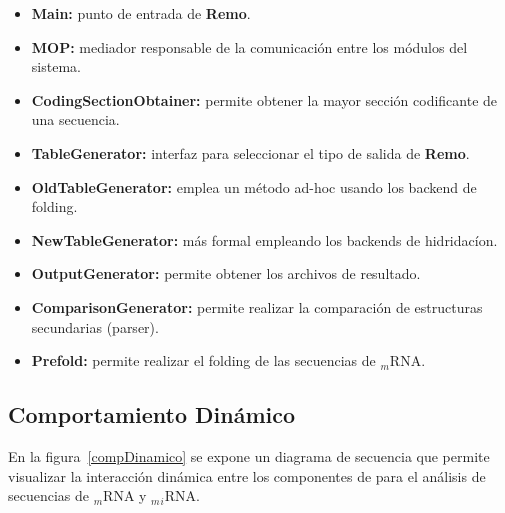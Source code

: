 \begin{itemize}
	\item \textbf{Main:} punto de entrada de \textbf{Remo}.
	\item \textbf{MOP:} mediador responsable de la comunicación entre los módulos del sistema.

	\item \textbf{CodingSectionObtainer:} permite obtener la mayor sección codificante de una secuencia.

	\item \textbf{TableGenerator:} interfaz para seleccionar el tipo de salida de \textbf{Remo}.

	\item \textbf{OldTableGenerator:} emplea un método ad-hoc usando los backend de folding.

	\item \textbf{NewTableGenerator:} más formal empleando los backends de hidridacíon.

	\item \textbf{OutputGenerator:} permite obtener los archivos de resultado.

	\item \textbf{ComparisonGenerator:} permite realizar la comparación de estructuras secundarias (parser).

	\item \textbf{Prefold:} permite realizar el folding de las secuencias de $_m$RNA. 
\end{itemize}

\subsection{Comportamiento Dinámico}
En la figura~\ref{compDinamico} se expone un diagrama de secuencia que permite visualizar la interacción dinámica entre los componentes de \remo para el análisis de secuencias de $_m$RNA y $_m$$_i$RNA.


